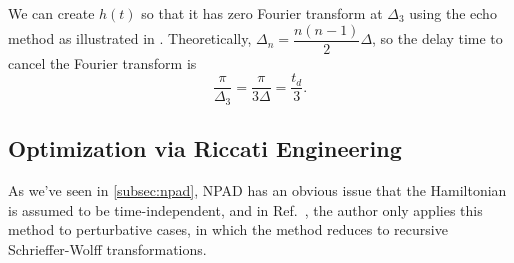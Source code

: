 We can create $h(t)$ so that it has zero Fourier transform at $\Delta_3$ using the echo method as illustrated in
.
Theoretically, $\Delta_n = \dfrac{n(n-1)}{2}\Delta$, so the delay time to cancel the Fourier transform is
$$
  \dfrac{\pi}{\Delta_3}=\dfrac{\pi}{3\Delta} = \dfrac{t_d}{3}.
$$

\subsection{Optimization via Riccati Engineering}\label{subsec:method_riccati}
As we've seen in \ref{subsec:npad}, NPAD has an obvious issue that the Hamiltonian is assumed to be
time-independent, and in Ref.~\cite{NPAD2022}, the author only applies this method to perturbative cases, in which the
method reduces to recursive Schrieffer-Wolff transformations.

